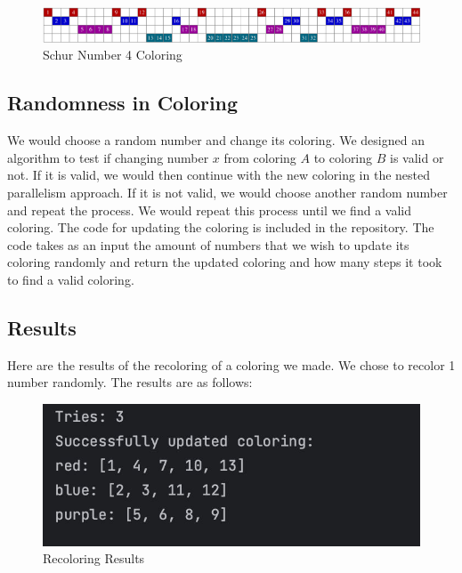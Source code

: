 \documentclass[12pt]{article}
\begin{document}
\vspace{1cm} %

\begin{figure}[h!]
    \centering
    \includegraphics[width=\textwidth]{schur_four.png}
    \caption{Schur Number 4 Coloring}
    \label{fig:schur4}
\end{figure}

\subsection{Randomness in Coloring}
We would choose a random number and change its coloring. We designed an algorithm to test if changing number $x$ from coloring $A$ to coloring $B$ is valid or not. If it is valid, we would then continue with the new coloring in the nested parallelism approach. If it is not valid, we would choose another random number and repeat the process. We would repeat this process until we find a valid coloring.
The code for updating the coloring is included in the repository. The code takes as an input the amount of numbers that we wish to update its coloring randomly and return the updated coloring and how many steps it took to find a valid coloring.

\subsection{Results}
Here are the results of the recoloring of a coloring we made. We chose to recolor 1 number randomly. The results are as follows:

\begin{figure}
    \centering
    \includegraphics[width=\textwidth]{recoloring_results.jpeg}
    \caption{Recoloring Results}
    \label{fig:recoloring}
\end{figure}
\end{document}
